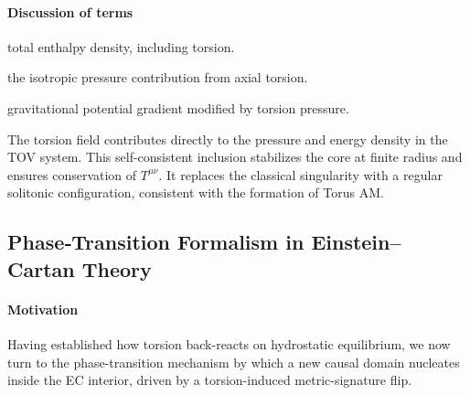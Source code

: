\documentclass{article}
\begin{document}
\paragraph{Discussion of terms}
\begin{description}[leftmargin=2em]
  \item[\(\rho c^2 + P\)] total enthalpy density, including torsion.
  \item[\(P_r = P_t = -\frac{\alpha}{2} S^2\)] the isotropic pressure contribution from axial torsion.
  \item[\(\Phi'(r)\)] gravitational potential gradient modified by torsion pressure.
  \item[Physical consequences]  
    The torsion field contributes directly to the pressure and energy density in the TOV system. This self-consistent inclusion stabilizes the core at finite radius and ensures conservation of $T^{\mu\nu}$. It replaces the classical singularity with a regular solitonic configuration, consistent with the formation of Torus AM.
\end{description}

\medskip
\begin{center}
\end{center}
\medskip



\subsection{Phase‐Transition Formalism in Einstein–Cartan Theory}
\label{sec:phase-transition}
\paragraph{Motivation}
Having established how torsion back-reacts on hydrostatic equilibrium, we now turn to the phase-transition mechanism by which a new causal domain nucleates inside the EC interior, driven by a torsion-induced metric-signature flip.
\end{document}
